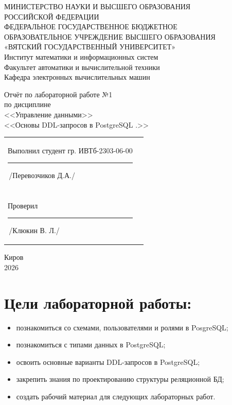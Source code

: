 \documentclass[oneside,a4paper,14pt]{extarticle} %
\begin{document}
\newpage\thispagestyle{empty}
\begin{center}
	МИНИСТЕРСТВО НАУКИ И ВЫСШЕГО ОБРАЗОВАНИЯ\\
	РОССИЙСКОЙ ФЕДЕРАЦИИ\\
	ФЕДЕРАЛЬНОЕ ГОСУДАРСТВЕННОЕ БЮДЖЕТНОЕ\\
	ОБРАЗОВАТЕЛЬНОЕ
	УЧРЕЖДЕНИЕ ВЫСШЕГО ОБРАЗОВАНИЯ\\
	«ВЯТСКИЙ ГОСУДАРСТВЕННЫЙ УНИВЕРСИТЕТ»\\
	Институт математики и информационных систем\\
	Факультет автоматики и вычислительной техники\\
	Кафедра электронных вычислительных машин
\end{center}
\vspace{30mm}

\begin{center}
	Отчёт по лабораторной работе №1\\
	по дисциплине\\
	<<Управление данными>>\\
	<<Основы DDL-запросов в PostgreSQL .>>\\
\end{center}
\vspace{40mm}

\noindent
\begin{tabular}{l r}

	Выполнил студент гр. ИВТб-2303-06-00
	\hspace{10mm} \rule[-1mm]{20mm}{0.15mm}\,/Перевозчиков Д.А./ \\ \\


	Проверил
	\hspace{57mm}
	\rule[-1mm]{20mm}{0.15mm}\,/Клюкин В. Л./
\end{tabular}

\vfill
\begin{center}
	Киров\\
	2026
\end{center}


\newpage\thispagestyle{empty}

\section{Цели лабораторной работы:}
\begin{itemize}
	\item познакомиться со схемами, пользователями и ролями в PosgreSQL;
	\item познакомиться с типами данных в PostgreSQL; 
	\item освоить основные варианты DDL-запросов в PostgreSQL; 
	\item закрепить знания по проектированию структуры реляционной БД; 
	\item создать рабочий материал для следующих лабораторных работ. 
\end{itemize}
\end{document}
